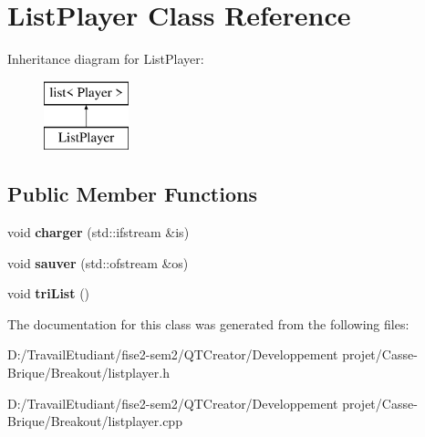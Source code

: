 \hypertarget{class_list_player}{}\section{List\+Player Class Reference}
\label{class_list_player}
Inheritance diagram for List\+Player\+:\begin{figure}[H]
\begin{center}
\leavevmode
\includegraphics[height=2.000000cm]{class_list_player}
\end{center}
\end{figure}
\subsection*{Public Member Functions}
\begin{DoxyCompactItemize}
\item 
\mbox{\label{class_list_player_a51419d9b0d08358b6384e13c462247b4}} 
void {\bfseries charger} (std\+::ifstream \&is)
\item 
\mbox{\label{class_list_player_ad350875939b59a7a0203b7e7c4cc6602}} 
void {\bfseries sauver} (std\+::ofstream \&os)
\item 
\mbox{\label{class_list_player_a5b8f02efc75e1bafd2300ac2d308eda5}} 
void {\bfseries tri\+List} ()
\end{DoxyCompactItemize}


The documentation for this class was generated from the following files\+:\begin{DoxyCompactItemize}
\item 
D\+:/\+Travail\+Etudiant/fise2-\/sem2/\+Q\+T\+Creator/\+Developpement projet/\+Casse-\/\+Brique/\+Breakout/listplayer.\+h\item 
D\+:/\+Travail\+Etudiant/fise2-\/sem2/\+Q\+T\+Creator/\+Developpement projet/\+Casse-\/\+Brique/\+Breakout/listplayer.\+cpp\end{DoxyCompactItemize}

